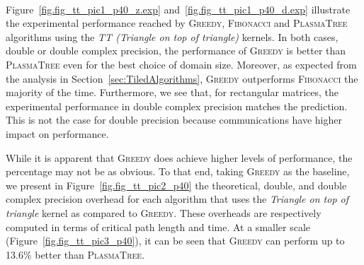 \documentclass[a4paper,twopages]{article}
\newcommand{\MC}{\textsc{Fibonacci}\xspace}
\newcommand{\Greedy}{\textsc{Greedy}\xspace}
\newcommand{\PT}{\textsc{PlasmaTree}\xspace}
\begin{document}
\begin{sidewaysfigure*}
\centering
\begin{minipage}{\linewidth}
\caption{\label{fig.fig_tt_pic2_p40} Overhead in terms of critical path length and time with respect to \Greedy (\Greedy = 1) }
\end{minipage}
\\
\begin{minipage}{\linewidth}

\caption{\label{fig.fig_tt_pic3_p40} Detailed view of the overhead in terms of critical path length and time with respect to \Greedy (\Greedy = 1) }
\end{minipage}
\end{sidewaysfigure*}

Figure~\ref{fig.fig_tt_pic1_p40_z.exp} and~\ref{fig.fig_tt_pic1_p40_d.exp}
illustrate the experimental performance reached by \linebreak \Greedy, \MC and \PT
algorithms using the \emph{TT (Triangle on top of triangle)} kernels. In both cases,
double or double complex precision, the performance of \Greedy is better than
\PT even for the best choice of domain size.  Moreover, as expected from the
analysis in Section~\ref{sec:TiledAlgorithms}, \Greedy outperforms \MC the
majority of the time.  Furthermore, we see that, for rectangular matrices, the
experimental performance in double complex precision matches the prediction.
This is not the case for double precision because communications have higher
impact on performance.

While it is apparent that \Greedy does achieve higher levels of performance,
the percentage may not be as obvious.  To that end, taking \Greedy as the
baseline, we present in Figure~\ref{fig.fig_tt_pic2_p40} the theoretical,
double, and double complex precision overhead for each algorithm that uses the
\emph{Triangle on top of triangle} kernel as compared to \Greedy. These
overheads are respectively computed in terms of critical path length and time.
At a smaller scale (Figure~\ref{fig.fig_tt_pic3_p40}), it can be seen that
\Greedy can perform up to 13.6\% better than \PT.
\end{document}
